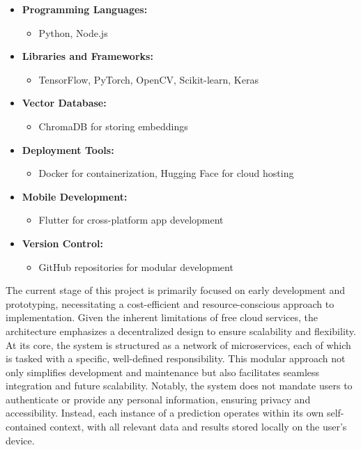 \begin{itemize}

\item \textbf{Programming Languages:}
\begin{itemize}
\item Python, Node.js
\end{itemize}

\item \textbf{Libraries and Frameworks:}
\begin{itemize}
\item TensorFlow, PyTorch, OpenCV, Scikit-learn, Keras
\end{itemize}

\item \textbf{Vector Database:}
\begin{itemize}
\item ChromaDB for storing embeddings
\end{itemize}

\item \textbf{Deployment Tools:}
\begin{itemize}
\item Docker for containerization, Hugging Face for cloud hosting
\end{itemize}

\item \textbf{Mobile Development:}
\begin{itemize}
\item Flutter for cross-platform app development
\end{itemize}

\item \textbf{Version Control:}
\begin{itemize}
\item GitHub repositories for modular development
\end{itemize}

\end{itemize}

The current stage of this project is primarily focused on early development and prototyping, necessitating a cost-efficient and resource-conscious approach to implementation. Given the inherent limitations of free cloud services, the architecture emphasizes a decentralized design to ensure scalability and flexibility. At its core, the system is structured as a network of microservices, each of which is tasked with a specific, well-defined responsibility. This modular approach not only simplifies development and maintenance but also facilitates seamless integration and future scalability. Notably, the system does not mandate users to authenticate or provide any personal information, ensuring privacy and accessibility. Instead, each instance of a prediction operates within its own self-contained context, with all relevant data and results stored locally on the user’s device.

